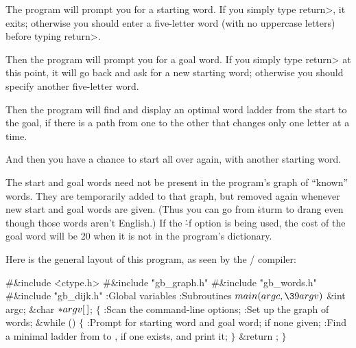 \fi

The program will prompt you for a starting word. If you simply type
\<return>, it exits; otherwise you should enter a five-letter word
(with no uppercase letters) before typing \<return>.

Then the program will prompt you for a goal word. If you simply type
\<return> at this point, it will go back and ask for a new starting word;
otherwise you should specify another five-letter word.

Then the program will find and display an optimal word ladder from the start
to the goal, if there is a path from one to the other
that changes only one letter at a time.

And then you have a chance to start all over again, with another starting word.

The start and goal words need not be present in the program's graph of
``known'' words. They are temporarily added to that graph, but removed
again whenever new start and goal words are given. (Thus you can go
from \.{sturm} to \.{drang} even though those words aren't English.)
If the \.{-f} option is being used, the cost of the goal word will be 20
when it is not in the program's dictionary.

\fi

Here is the general layout of this program, as seen by the \CEE/ compiler:

\Y\B\8\#\&{include} \.{<ctype.h>}\6
\8\#\&{include} \.{"gb\_graph.h"}\6
\8\#\&{include} \.{"gb\_words.h"}\6
\8\#\&{include} \.{"gb\_dijk.h"}\6
\ATH\7
:Global variables\X\6
:Subroutines\X\7
${}\\{main}(\\{argc},\39\\{argv}){}$\1\1\6
\&{int} \\{argc};\6
\&{char} ${}{*}\\{argv}[\,]{}$;\2\2\6
${}\{{}$\1\6
:Scan the command-line options\X;\6
:Set up the graph of words\X;\6
\&{while} ()\5
${}\{{}$\1\6
:Prompt for starting word and goal word;  if none given\X;\6
:Find a minimal ladder from  to , if one exists,
and print it\X;\6
\4${}\}{}$\2\6
\&{return} ;\6
\4${}\}{}$\2\par
\fi

